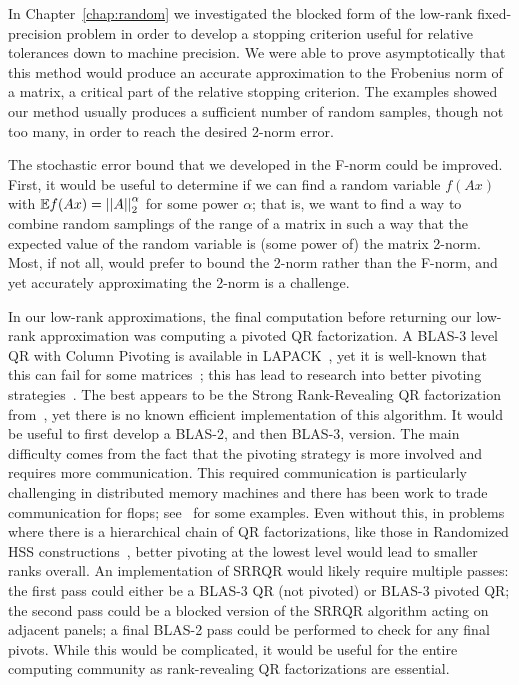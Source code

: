 In Chapter~\ref{chap:random} we investigated the blocked form of the
low-rank fixed-precision problem in order to develop a stopping
criterion useful for relative tolerances down to machine precision.
We were able to prove asymptotically that this method would
produce an accurate approximation to the Frobenius norm of a matrix,
a critical part of the relative stopping criterion.
The examples showed our method usually produces a sufficient number
of random samples, though not too many, in order to reach
the desired 2-norm error.

The stochastic error bound that we developed in the F-norm
could be improved.
First, it would be useful to determine if we can find a random variable
$f(Ax)$ with $\mathbb{E} f(Ax)=\left| \left| A \right| \right|_{2}^{\alpha}$ for some power $\alpha$;
that is, we want to find a way to combine random samplings of the
range of a matrix in such a way that the expected value of the random
variable is (some power of) the matrix 2-norm.
Most, if not all, would prefer to bound the 2-norm rather than
the F-norm, and yet accurately approximating the 2-norm is a challenge.

In our low-rank approximations, the final computation before
returning our low-rank approximation was computing a pivoted
QR factorization.
A BLAS-3 level QR with Column Pivoting is available
in LAPACK~\cite{quintana1998blas,anderson1999lapack},
yet it is well-known that this can fail for some
matrices~\cite{kahan1966numerical}; %
this has lead to research into better pivoting
strategies~\cite{chandrasekaran1994rank,chan1987rank}.
The best appears to be the Strong Rank-Revealing QR factorization
from~\cite{gu1996efficient}, yet there is no known
efficient implementation of this algorithm.
It would be useful to first develop a BLAS-2, and then BLAS-3, version.
The main difficulty comes from the fact that the pivoting strategy
is more involved and requires more communication.
This required communication is particularly challenging in distributed
memory machines and there has been work to trade communication
for flops;
see~\cite{demmel2015communication,donfack2010adapting,khabou2013lu,
solomonik2011communication} for some examples.
Even without this, in problems where there is a hierarchical chain
of QR factorizations, like those in Randomized
HSS constructions~\cite{randomHSSLBL},
better pivoting at the lowest level would lead to smaller ranks overall.
An implementation of SRRQR would likely require multiple passes:
the first pass could either be a BLAS-3 QR (not pivoted)
or BLAS-3 pivoted QR; the second pass could be a blocked
version of the SRRQR algorithm acting on adjacent panels;
a final BLAS-2 pass could be performed to check for any final pivots.
While this would be complicated, it would be useful for the entire
computing community as rank-revealing QR factorizations are essential.
